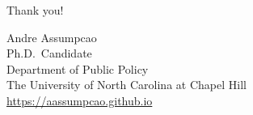 \documentclass[10pt,ignorenonframetext,]{beamer}
\begin{document}
\begin{frame}{Thank you!}
\protect\hypertarget{thank-you}{}

Andre Assumpcao\\
Ph.D.~Candidate\\
Department of Public Policy\\
The University of North Carolina at Chapel Hill\\
\url{https://aassumpcao.github.io}

\end{frame}
\end{document}
